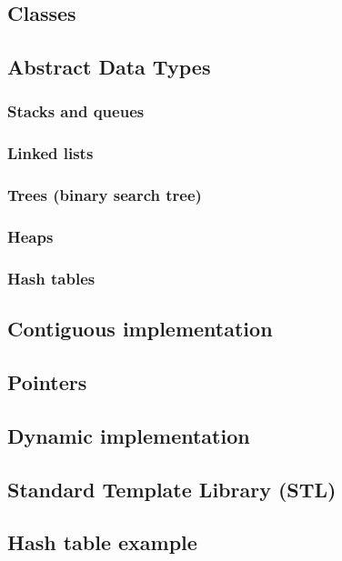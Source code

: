 \subsection{Classes}




\subsection{Abstract Data Types}

\subsubsection{Stacks and queues}

\subsubsection{Linked lists}

\subsubsection{Trees (binary search tree)}

\subsubsection{Heaps}

\subsubsection{Hash tables}

\subsection{Contiguous implementation}

\subsection{Pointers}

\subsection{Dynamic implementation}

\subsection{Standard Template Library (STL)}

\subsection{Hash table example}